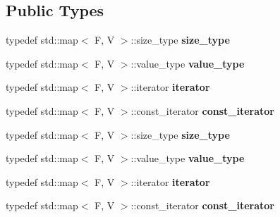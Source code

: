 \subsection*{Public Types}
\begin{DoxyCompactItemize}
\item 
\hypertarget{classsvector_a781cf3071f4c7e8ed3b9247c34c783c1}{
typedef std::map$<$ F, V $>$::size\_\-type {\bfseries size\_\-type}}
\label{classsvector_a781cf3071f4c7e8ed3b9247c34c783c1}

\item 
\hypertarget{classsvector_a6ad53776885c70adeb9fb67c7a4d6f23}{
typedef std::map$<$ F, V $>$::value\_\-type {\bfseries value\_\-type}}
\label{classsvector_a6ad53776885c70adeb9fb67c7a4d6f23}

\item 
\hypertarget{classsvector_a49425052f4c63a771edf0c09ad52bb2e}{
typedef std::map$<$ F, V $>$::iterator {\bfseries iterator}}
\label{classsvector_a49425052f4c63a771edf0c09ad52bb2e}

\item 
\hypertarget{classsvector_a12c0ac4d5d48eb68f0024b4a1ebe597b}{
typedef std::map$<$ F, V $>$::const\_\-iterator {\bfseries const\_\-iterator}}
\label{classsvector_a12c0ac4d5d48eb68f0024b4a1ebe597b}

\item 
\hypertarget{classsvector_a781cf3071f4c7e8ed3b9247c34c783c1}{
typedef std::map$<$ F, V $>$::size\_\-type {\bfseries size\_\-type}}
\label{classsvector_a781cf3071f4c7e8ed3b9247c34c783c1}

\item 
\hypertarget{classsvector_a6ad53776885c70adeb9fb67c7a4d6f23}{
typedef std::map$<$ F, V $>$::value\_\-type {\bfseries value\_\-type}}
\label{classsvector_a6ad53776885c70adeb9fb67c7a4d6f23}

\item 
\hypertarget{classsvector_a49425052f4c63a771edf0c09ad52bb2e}{
typedef std::map$<$ F, V $>$::iterator {\bfseries iterator}}
\label{classsvector_a49425052f4c63a771edf0c09ad52bb2e}

\item 
\hypertarget{classsvector_a12c0ac4d5d48eb68f0024b4a1ebe597b}{
typedef std::map$<$ F, V $>$::const\_\-iterator {\bfseries const\_\-iterator}}
\label{classsvector_a12c0ac4d5d48eb68f0024b4a1ebe597b}

\end{DoxyCompactItemize}
